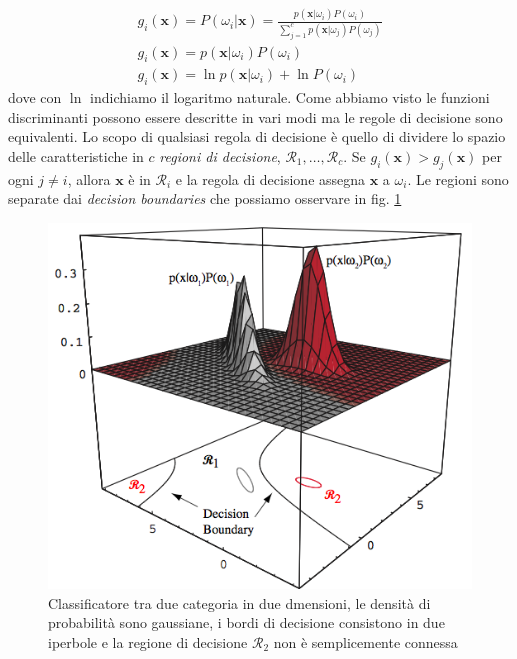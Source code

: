 \begin{gather}
g_i(\mathbf{x}) = P(\omega_i|\mathbf{x}) = \frac{p(\mathbf{x}|\omega_i) P(\omega_i)}{\sum_{j=1}^c p(\mathbf{x} | \omega_j) P(\omega_j)}\\
g_i(\mathbf{x}) = p(\mathbf{x}|\omega_i) P(\omega_i)\\
g_i(\mathbf{x}) = \ln p(\mathbf{x}|\omega_i) + \ln P(\omega_i)
\end{gather} 
dove con $\ln$ indichiamo il logaritmo naturale.
Come abbiamo visto le funzioni discriminanti possono essere descritte in vari modi ma le regole di decisione sono equivalenti. Lo scopo di qualsiasi regola di decisione è quello di dividere lo spazio delle caratteristiche in $c$ \emph{regioni di decisione}, $\mathcal{R}_1, \dots, \mathcal{R}_c$. Se $g_i(\mathbf{x}) > g_j(\mathbf{x})$ per ogni $j \neq i$, allora $\mathbf{x}$ è in $\mathcal{R}_i$ e la regola di decisione assegna $\mathbf{x}$ a $\omega_i$. Le regioni sono separate dai \emph{decision boundaries} che possiamo osservare in fig. \ref{decisionBoundaries}
\begin{figure}
\centering
\includegraphics[scale=0.6]{img/decisionBoundaries.png}
\caption{Classificatore tra due categoria in due dmensioni, le densità di probabilità sono gaussiane, i bordi di decisione consistono in due iperbole e la regione di decisione $\mathcal{R}_2$ non è semplicemente connessa}
\label{decisionBoundaries}
\end{figure}

